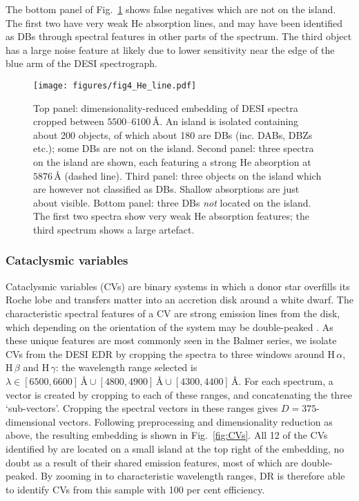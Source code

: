 \documentclass[fleqn,usenatbib]{mnras}
\begin{document}
The bottom panel of Fig.~\ref{fig:He_lines} shows false negatives which are not on the island.
The first two have very weak He absorption lines, and may have been identified as DBs through spectral features in other parts of the spectrum.
The third object has a large noise feature at likely due to lower sensitivity near the edge of the blue arm of the DESI spectrograph.

\begin{figure}
\centering
\texttt{[image: figures/fig4\_He\_line.pdf]}
\caption{
    Top panel: dimensionality-reduced embedding of DESI spectra cropped between $5500$--$6100\,\text{\AA}$.
    An island is isolated containing about 200 objects, of which about 180 are DBs (inc. DABs, DBZs etc.); some DBs are not on the island.
    Second panel: three spectra on the island are shown, each featuring a strong He absorption at $5876\,\text{\AA}$ (dashed line).
    Third panel: three objects on the island which are however not classified as DBs.
    Shallow absorptions are just about visible.
    Bottom panel: three DBs \textit{not} located on the island.
    The first two spectra show very weak He absorption features; the third spectrum shows a large artefact.
}
\label{fig:He_lines}
\end{figure}

\subsubsection{Cataclysmic variables}
\label{sec:CVs}

Cataclysmic variables (CVs) are binary systems in which a donor star overfills its Roche lobe and transfers matter into an accretion disk around a white dwarf.
The characteristic spectral features of a CV are strong emission lines from the disk, which depending on the orientation of the system may be double-peaked \citep{smak69, huang72}.
As these unique features are most commonly seen in the Balmer series, we isolate CVs from the DESI EDR by cropping the spectra to three windows around H$\,\alpha$, H$\,\beta$ and H$\,\gamma$:
the wavelength range selected is $\lambda \in [6500, 6600]\,\text{\AA} \cup [4800, 4900]\,\text{\AA} \cup [4300, 4400]\,\text{\AA}$.
For each spectrum, a vector is created by cropping to each of these ranges, and concatenating the three `sub-vectors'.
Cropping the spectral vectors in these ranges gives $D=375$-dimensional vectors.
Following preprocessing and dimensionality reduction as above, the resulting embedding is shown in Fig.~\ref{fig:CVs}.
All 12 of the CVs identified by \citet{manser24} are located on a small island at the top right of the embedding, no doubt as a result of their shared emission features, most of which are double-peaked.
By zooming in to characteristic wavelength ranges, DR is therefore able to identify CVs from this sample with 100 per cent efficiency.
\end{document}
